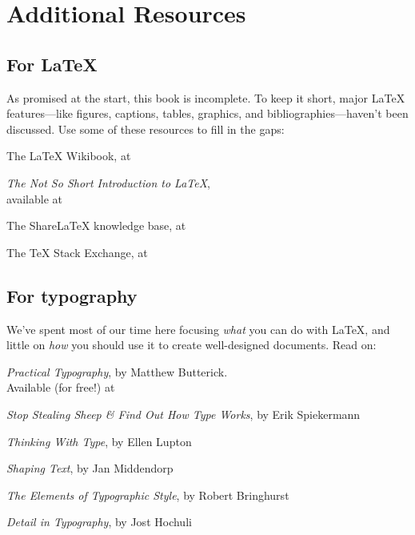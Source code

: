 \setlength\parskip{0.6\baselineskip}
\setlength\parindent{0pt}

\chapter{Additional Resources}
\label{resources}

\section{For \texorpdfstring{\LaTeX}{LaTeX}}

As promised at the start, this book is incomplete.
To keep it short,
major \LaTeX{} features---like figures, captions, tables, graphics,
and bibliographies---haven't been discussed.
Use some of these resources to fill in the gaps:
\begin{leftfigure}
The \LaTeX{} Wikibook, at 

\textit{The Not So Short Introduction to \LaTeX}, \\
available at 

The Share\LaTeX{} knowledge base, at 

The \TeX{} Stack Exchange, at 
\end{leftfigure}

\section{For typography}

We've spent most of our time here focusing \emph{what} you can do with \LaTeX,
and little on \emph{how} you should use it to create well-designed documents.
Read on:
\begin{leftfigure}
\textit{Practical Typography}, by Matthew Butterick. \\
Available (for free!) at 

\textit{Stop Stealing Sheep \& Find Out How Type Works}, by Erik Spiekermann

\textit{Thinking With Type}, by Ellen Lupton

\textit{Shaping Text}, by Jan Middendorp

\textit{The Elements of Typographic Style}, by Robert Bringhurst

\textit{Detail in Typography}, by Jost Hochuli
\end{leftfigure}

